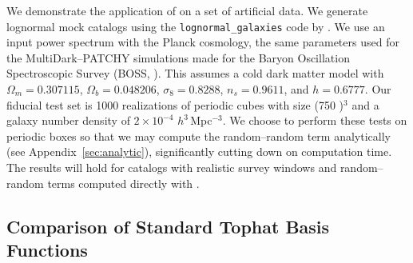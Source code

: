 We demonstrate the application of \est on a set of artificial data.
We generate lognormal mock catalogs \citep{ColesJones1991} using the \texttt{lognormal\_galaxies} code by \citep{Agrawal2017}.
We use an input power spectrum with the Planck cosmology, the same parameters used for the MultiDark--PATCHY simulations \citep{Kitaura2016} made for the Baryon Oscillation Spectroscopic Survey (BOSS, \citealt{Dawson2013}).
This assumes a cold dark matter model with $\Omega_m = 0.307115$, $\Omega_b = 0.048206$, $\sigma_8 = 0.8288$, $n_s = 0.9611$, and $h = 0.6777$.
Our fiducial test set is 1000 realizations of periodic cubes with size (750 \hmpc)$^3$ and a galaxy number density of $2 \times 10^{-4}$ $h^{3}\,$Mpc$^{-3}$.
We choose to perform these tests on periodic boxes so that we may compute the random--random term analytically (see Appendix~\ref{sec:analytic}), significantly cutting down on computation time.
The results will hold for catalogs with realistic survey windows and random--random terms computed directly with \est.

\subsection{Comparison of Standard Tophat Basis Functions}

